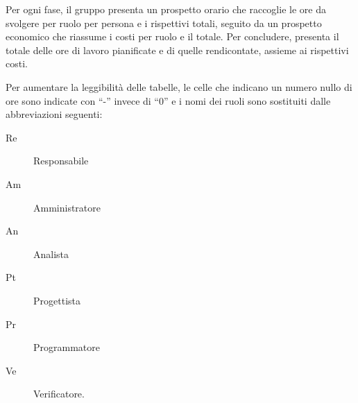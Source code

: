 \documentclass[../piano-di-progetto.tex]{subfiles}
\begin{document}
Per ogni fase, il gruppo presenta un prospetto orario che raccoglie le ore da svolgere per ruolo per persona e i rispettivi totali, seguito da un prospetto economico che riassume i costi per ruolo e il totale. Per concludere, presenta il totale delle ore di lavoro pianificate e di quelle rendicontate, assieme ai rispettivi costi.

Per aumentare la leggibilità delle tabelle, le celle che indicano un numero nullo di ore sono indicate con ``-'' invece di ``0'' e i nomi dei ruoli sono sostituiti dalle abbreviazioni seguenti:
\begin{description}
  \item[Re] Responsabile
  \item[Am] Amministratore
  \item[An] Analista
  \item[Pt] Progettista
  \item[Pr] Programmatore
  \item[Ve] Verificatore.
\end{description}
\end{document}
